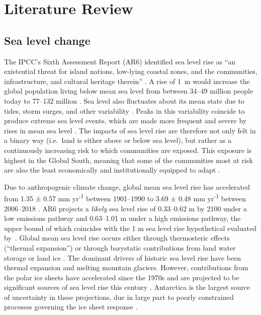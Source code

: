 \chapter{Literature Review}

\section{Sea level change}

The IPCC's Sixth Assessment Report (AR6) identified sea level rise as ``an existential threat for island nations, low-lying coastal zones, and the communities, infrastructure, and cultural heritage therein'' \citep{cooleyOceansCoastalEcosystems2022}. A rise of 1~m would increase the global population living below mean sea level from between 34--49 million people today to 77--132 million \citep{seegerSeaLevelMuch2026}. Sea level also fluctuates about its mean state due to tides, storm surges, and other variability \citep{woodworthForcingFactorsAffecting2019}. Peaks in this variability coincide to produce extreme sea level events, which are made more frequent and severe by rises in mean sea level \citep{boumisCoevolutionExtremeSea2023}. The impacts of sea level rise are therefore not only felt in a binary way (i.e.~land is either above or below sea level), but rather as a continuously increasing risk to which communities are exposed. This exposure is highest in the Global South, meaning that some of the communities most at risk are also the least economically and institutionally equipped to adapt \citep{seegerSeaLevelMuch2026,oneillKeyRisksSectors2022}.

Due to anthropogenic climate change, global mean sea level rise has accelerated from 1.35 ± 0.57 mm yr\textsuperscript{-1} between 1901--1990 to 3.69 ± 0.48 mm yr\textsuperscript{-1} between 2006--2018 \citep{fox-kemperOceanCryosphereSea2021}. AR6 projects a \textit{likely} sea level rise of 0.33--0.62 m by 2100 under a low emissions pathway and 0.63--1.01 m under a high emissions pathway, the upper bound of which coincides with the 1 m sea level rise hypothetical evaluated by~\cite{seegerSeaLevelMuch2026}. Global mean sea level rise occurs either through thermosteric effects (``thermal expansion'') or through barystatic contributions from land water storage or land ice \citep{gregoryConceptsTerminologySea2019}. The dominant drivers of historic sea level rise have been thermal expansion and melting mountain glaciers. However, contributions from the polar ice sheets have accelerated since the 1970s and are projected to be significant sources of sea level rise this century \citep{fox-kemperOceanCryosphereSea2021}. Antarctica is the largest source of uncertainty in these projections, due in large part to poorly constrained processes governing the ice sheet response \citep{edwardsProjectedLandIce2021}.

